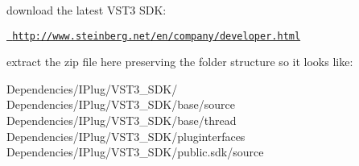 download the latest V\+S\+T3 S\+DK\+:

\href{http://www.steinberg.net/en/company/developer.html}{\texttt{ http\+://www.\+steinberg.\+net/en/company/developer.\+html}}

extract the zip file here preserving the folder structure so it looks like\+:

{\ttfamily Dependencies/\+I\+Plug/\+V\+S\+T3\+\_\+\+S\+D\+K/} ~\newline
 {\ttfamily Dependencies/\+I\+Plug/\+V\+S\+T3\+\_\+\+S\+D\+K/base/source} ~\newline
 {\ttfamily Dependencies/\+I\+Plug/\+V\+S\+T3\+\_\+\+S\+D\+K/base/thread} ~\newline
 {\ttfamily Dependencies/\+I\+Plug/\+V\+S\+T3\+\_\+\+S\+D\+K/pluginterfaces} ~\newline
 {\ttfamily Dependencies/\+I\+Plug/\+V\+S\+T3\+\_\+\+S\+D\+K/public.\+sdk/source} ~\newline
 